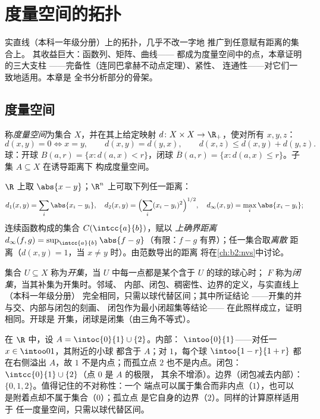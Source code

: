 \chapter{度量空间的拓扑}\label{ch:b2:metric}

实直线（本科一年级分册）上的拓扑，几乎不改一字地
推广到任意赋有距离的集合上。
其收益巨大：函数列、矩阵、曲线——
都成为度量空间中的点，本章证明的三大支柱
——完备性（连同巴拿赫不动点定理）、紧性、
连通性——对它们一致地适用。本章是
全书分析部分的骨架。

\section{度量空间}

\begin{definition}\label{def:b2:metric:def}
称\emph{度量空间}为集合 $X$，并在其上给定映射 $d
\colon X \times X \to \R_+$，使对所有 $x, y, z$：
\[
d(x,y) = 0 \iff x = y,
\qquad
d(x,y) = d(y,x),
\qquad
d(x,z) \leq d(x,y) + d(y,z).
\]
球：开球 $B(a, r) = \{x : d(a,x) < r\}$，闭球 $\overline B(a,r) =
\{x : d(a,x) \leq r\}$。子集 $A \subseteq X$ 在诱导距离下
构成度量空间。
\end{definition}

\begin{example}\label{ex:b2:metric:examples}
$\R$ 上取 $\abs{x - y}$；$\R^n$ 上可取下列任一距离：
\[
d_1(x,y) = \sum_i \abs{x_i - y_i},
\quad
d_2(x,y) = \Bigl(\sum_i (x_i - y_i)^2\Bigr)^{1/2},
\quad
d_\infty(x,y) = \max_i \abs{x_i - y_i};
\]
连续函数构成的集合 $C(\intcc{a}{b})$，赋以
\emph{上确界距离} $d_\infty(f, g) = \sup_{\intcc{a}{b}} \abs{f -
g}$（有限：$f - g$ 有界）；任一集合取\emph{离散}
距离（$d(x,y) = 1$，当 $x \neq y$ 时）。由范数导出的距离
将在\cref{ch:b2:nvs}中讨论。
\end{example}

\begin{definition}[度量空间的拓扑]\label{def:b2:metric:topology}
集合 $U \subseteq X$ 称为\emph{开集}，当
$U$ 中每一点都是某个含于 $U$ 的球的球心时；
$F$ 称为\emph{闭集}，当其补集为开集时。邻域、
内部、闭包、稠密性、边界的定义，与实直线上（本科一年级分册）
完全相同，只需以球代替区间；其中所证结论
——开集的并与交、内部与闭包的刻画、
闭包作为最小闭超集等结论——
在此照样成立，证明相同。开球是
开集，闭球是闭集（由三角不等式）。
\end{definition}

\begin{example}\label{ex:b2:metric:intclosure}
在 $\R$ 中，设 $A = \intoc{0}{1} \cup \{2\}$。内部：
$\intoo{0}{1}$——对任一 $x \in \intoo01$，其附近的小球
都含于 $A$；对 $1$，每个球 $\intoo{1-r}{1+r}$ 都
在右侧溢出 $A$，故 $1$ 不是内点；而孤立点
$2$ 也不是内点。闭包：
$\intcc{0}{1} \cup \{2\}$（点 $0$ 是 $A$ 的极限，
其余不增添）。边界（闭包减去内部）：
$\{0, 1, 2\}$。值得记住的不对称性：一个
端点可以属于集合而非内点（$1$），也可以
是附着点却不属于集合（$0$）；孤立点
是它自身的边界（$2$）。同样的计算原样适用于
任一度量空间，只需以球代替区间。
\end{example}

